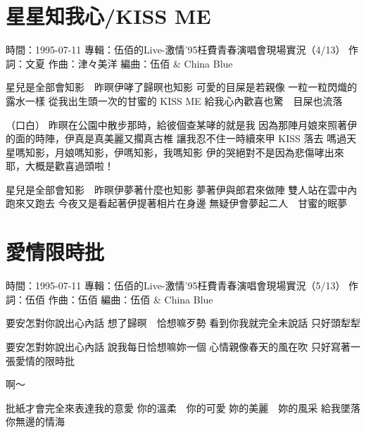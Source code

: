 \documentclass[UTF8,a4paper,oneside,twocolumn,12pt]{ctexbook}
\newcommand{\infopair}[2]{\textbullet #1：#2}
\newcommand{\zc}[1][伍佰]{\infopair{作詞}{#1}}
\newcommand{\zq}[1][伍佰]{\infopair{作曲}{#1}}
\newcommand{\bq}[1][伍佰]{\infopair{編曲}{#1}}
\newcommand{\zj}[1]{\infopair{專輯}{#1}}
\newcommand{\sj}[1]{\infopair{時間}{#1}}
\newenvironment{info}{\begin{flushleft}\kaishu
	}
	{\end{flushleft}\normalsize\yahei\par}
\newenvironment{lyric}{
	}
{}
\begin{document}
\section{星星知我心/KISS ME}
\begin{info}
	\sj{1995-07-11}
	\zj{伍佰的Live-激情'95枉費青春演唱會現場實況（4/13）}
	\zc[文夏] %
	\zq[津々美洋]
	\bq[伍佰 \& China Blue]
\end{info}
\begin{lyric}
	星兒是全部會知影　昨暝伊哮了歸暝也知影
	可愛的目屎是若親像
	一粒一粒閃熾的露水一樣
	從我出生頭一次的甘蜜的 KISS ME
	給我心內歡喜也驚　目屎也流落

	（口白）
	昨暝在公園中散步那時，給彼個查某哮的就是我
	因為那陣月娘來照著伊的面的時陣，伊真是真美麗又擱真古椎
	讓我忍不住一時續來甲 KISS 落去
	嗎過天星嗎知影，月娘嗎知影，伊嗎知影，我嗎知影
	伊的哭絕對不是因為悲傷哮出來耶，大概是歡喜過頭啦！

	星兒是全部會知影　昨暝伊夢著什麼也知影
	夢著伊與郎君來做陣
	雙人站在雲中內跑來又跑去
	今夜又是看起著伊提著相片在身邊
	無疑伊會夢起二人　甘蜜的眠夢
\end{lyric}

\section{愛情限時批}
\begin{info}
	\sj{1995-07-11}
	\zj{伍佰的Live-激情'95枉費青春演唱會現場實況（5/13）}
	\zc
	\zq
	\bq[伍佰 \& China Blue]
\end{info}
\begin{lyric}
	要安怎對你說出心內話
	想了歸暝　恰想嘛歹勢
	看到你我就完全未說話
	只好頭犁犁

	要安怎對妳說出心內話
	說我每日恰想嘛妳一個
	心情親像春天的風在吹
	只好寫著一張愛情的限時批

	啊～

	批紙才會完全來表達我的意愛
	你的溫柔　你的可愛  妳的美麗　妳的風采
	給我墜落你無邊的情海
\end{lyric}
\end{document}
